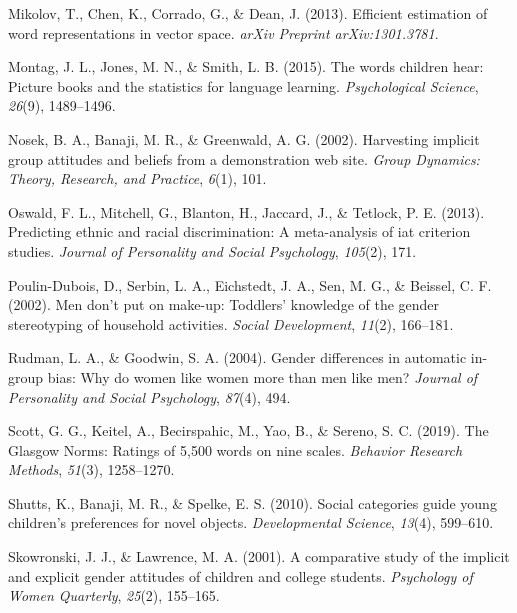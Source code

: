 \documentclass[
  english,
  ,man,floatsintext]{apa6}
\begin{document}
\leavevmode\hypertarget{ref-mikolov2013efficient}{}%
Mikolov, T., Chen, K., Corrado, G., \& Dean, J. (2013). Efficient estimation of word representations in vector space. \emph{arXiv Preprint arXiv:1301.3781}.

\leavevmode\hypertarget{ref-montag2015words}{}%
Montag, J. L., Jones, M. N., \& Smith, L. B. (2015). The words children hear: Picture books and the statistics for language learning. \emph{Psychological Science}, \emph{26}(9), 1489--1496.

\leavevmode\hypertarget{ref-nosek2002harvesting}{}%
Nosek, B. A., Banaji, M. R., \& Greenwald, A. G. (2002). Harvesting implicit group attitudes and beliefs from a demonstration web site. \emph{Group Dynamics: Theory, Research, and Practice}, \emph{6}(1), 101.

\leavevmode\hypertarget{ref-oswald2013predicting}{}%
Oswald, F. L., Mitchell, G., Blanton, H., Jaccard, J., \& Tetlock, P. E. (2013). Predicting ethnic and racial discrimination: A meta-analysis of iat criterion studies. \emph{Journal of Personality and Social Psychology}, \emph{105}(2), 171.

\leavevmode\hypertarget{ref-poulin2002men}{}%
Poulin-Dubois, D., Serbin, L. A., Eichstedt, J. A., Sen, M. G., \& Beissel, C. F. (2002). Men don't put on make-up: Toddlers' knowledge of the gender stereotyping of household activities. \emph{Social Development}, \emph{11}(2), 166--181.

\leavevmode\hypertarget{ref-rudman2004gender}{}%
Rudman, L. A., \& Goodwin, S. A. (2004). Gender differences in automatic in-group bias: Why do women like women more than men like men? \emph{Journal of Personality and Social Psychology}, \emph{87}(4), 494.

\leavevmode\hypertarget{ref-scott2019glasgow}{}%
Scott, G. G., Keitel, A., Becirspahic, M., Yao, B., \& Sereno, S. C. (2019). The Glasgow Norms: Ratings of 5,500 words on nine scales. \emph{Behavior Research Methods}, \emph{51}(3), 1258--1270.

\leavevmode\hypertarget{ref-shutts2010social}{}%
Shutts, K., Banaji, M. R., \& Spelke, E. S. (2010). Social categories guide young children's preferences for novel objects. \emph{Developmental Science}, \emph{13}(4), 599--610.

\leavevmode\hypertarget{ref-skowronski2001comparative}{}%
Skowronski, J. J., \& Lawrence, M. A. (2001). A comparative study of the implicit and explicit gender attitudes of children and college students. \emph{Psychology of Women Quarterly}, \emph{25}(2), 155--165.
\end{document}
